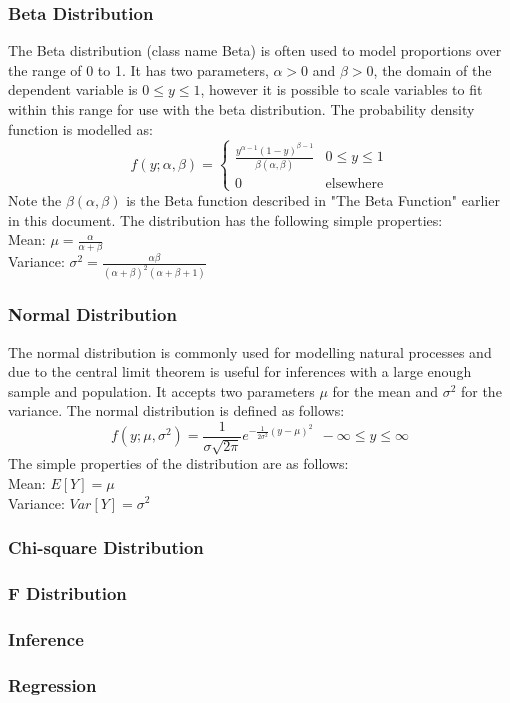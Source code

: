 \documentclass[a4paper]{article}
\begin{document}
\subsubsection*{Beta Distribution}
The Beta distribution (class name Beta) is often used to model proportions over the range of 0 to 1. It has two parameters, $\alpha > 0$ and $\beta > 0$, the domain of the dependent variable is $0 \le y \le 1$, however it is possible to scale variables to fit within this range for use with the beta distribution. The probability density function is modelled as:
\[
f(y; \alpha, \beta) = 
	\begin{cases}
		\frac{ y^{\alpha - 1} (1- y)^{\beta - 1} }{ \beta(\alpha, \beta) } & 0 \le y \le 1\\
		0 & \text{elsewhere}
	\end{cases}
\]
Note the $\beta(\alpha, \beta)$ is the Beta function described in "The Beta Function" earlier in this document. The distribution has the following simple properties:\\
Mean: $\mu = \frac{\alpha}{\alpha + \beta}$\\
Variance: $\sigma^2 = \frac{\alpha\beta}{(\alpha + \beta)^2(\alpha + \beta + 1)}$

\subsubsection*{Normal Distribution}

The normal distribution is commonly used for modelling natural processes and due to the central limit theorem is useful for inferences with a large enough sample and population. It accepts two parameters $\mu$ for the mean and $\sigma^2$ for the variance. The normal distribution is defined as follows:
$$
f(y; \mu, \sigma^2) =
		\frac{1}{\sigma \sqrt{2\pi} } e^{-\frac{1}{2\sigma^2}(y - \mu)^2} \ \  -\infty \le y \le \infty
$$
The simple properties of the distribution are as follows:\\
Mean: $E[Y] = \mu$\\
Variance: $Var[Y] = \sigma^2$

\subsubsection*{Chi-square Distribution}

\subsubsection*{F Distribution}


\subsubsection{Inference}

\subsubsection{Regression}
\end{document}
